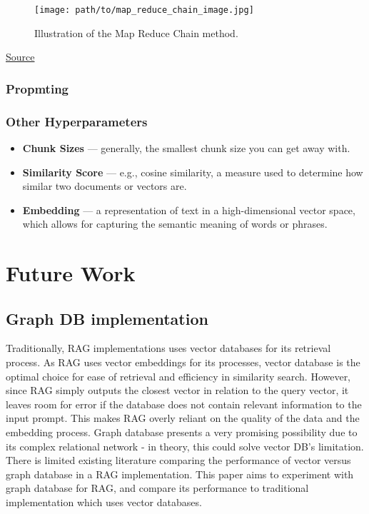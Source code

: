 \documentclass{scrartcl}
\begin{document}
\begin{figure}[H]
    \centering
    \texttt{[image: path/to/map\_reduce\_chain\_image.jpg]}
    \caption{Illustration of the Map Reduce Chain method.}
\end{figure}
\href{https://readmedium.com/en/https:/ogre51.medium.com/types-of-chains-in-langchain-823c8878c2e9}{Source}

\subsubsection{Propmting}

\subsubsection{Other Hyperparameters}
\begin{itemize}
    \item \textbf{Chunk Sizes} --- generally, the smallest chunk size you can get away with.
    \item \textbf{Similarity Score} --- e.g., cosine similarity, a measure used to determine how similar two documents or vectors are.
    \item \textbf{Embedding} --- a representation of text in a high-dimensional vector space, which allows for capturing the semantic meaning of words or phrases.
\end{itemize}


\section{Future Work}

\subsection{Graph DB implementation}

Traditionally, RAG implementations uses vector databases for its retrieval process. As RAG uses vector embeddings for its processes, vector database is the optimal choice for ease of retrieval and efficiency in similarity search.
However, since RAG simply outputs the closest vector in relation to the query vector, it leaves room for error if the database does not contain relevant information to the input prompt. This makes RAG overly reliant on the quality of the data and the embedding process.
Graph database presents a very promising possibility due to its complex relational network - in theory, this could solve vector DB's limitation.
There is limited existing literature comparing the performance of vector versus graph database in a RAG implementation. This paper aims to experiment with graph database for RAG, and compare its performance to traditional implementation which uses vector databases.
\end{document}
